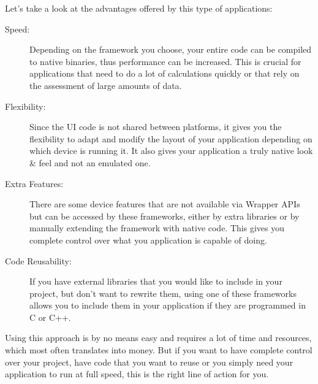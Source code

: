 Let's take a look at the advantages offered by this type of applications:

\begin{description}

\item[Speed:] Depending on the framework you choose, your entire code can be compiled to native binaries, thus performance can be increased. This is crucial for applications that need to do a lot of calculations quickly or that rely on the assessment of large amounts of data.

\item[Flexibility:] Since the \ac{UI} code is not shared between platforms, it gives you the flexibility to adapt and modify the layout of your application depending on which device is running it. It also gives your application a truly native look \& feel and not an emulated one.

\item[Extra Features:] There are some device features that are not available via Wrapper \ac{API}s but can be accessed by these frameworks, either by extra libraries or by manually extending the framework with native code. This gives you complete control over what you application is capable of doing.
 
\item[Code Reusability:] If you have external libraries that you would like to include in your project, but don't want to rewrite them, using one of these frameworks allows you to include them in your application if they are programmed in C or C++. 

\end{description}

Using this approach is by no means easy and requires a lot of time and resources, which most often translates into money. But if you want to have complete control over your project, have code that you want to reuse or you simply need your application to run at full speed, this is the right line of action for you.